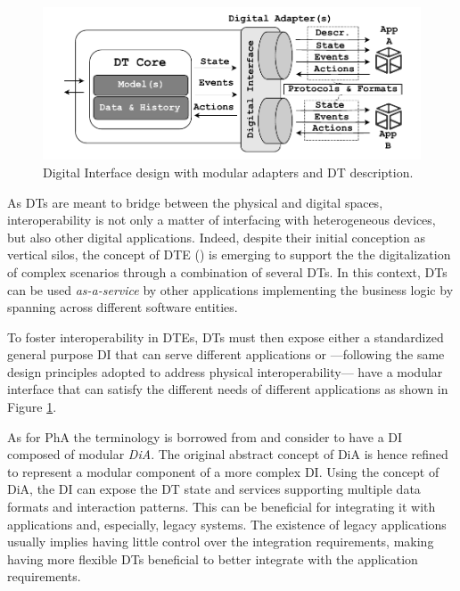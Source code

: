 \begin{figure}[t]
    \centering
    \includegraphics[width=\columnwidth]{figures/dt-interoperability/dt_interoperability_digital.pdf}
    \caption{Digital Interface design with modular adapters and DT description.}
    \label{fig:digital_interoperability}
\end{figure}

As \acp{DT} are meant to bridge between the physical and digital spaces,
interoperability is not only a matter of interfacing with heterogeneous devices, but also other digital applications.
Indeed, despite their initial conception as vertical silos, the concept of \ac{DTE} () is emerging to support the the digitalization of complex scenarios through a combination of several \acp{DT}.
%
In this context, \acp{DT} can be used \emph{as-a-service} by other applications implementing the business logic by spanning across different software entities.

To foster interoperability in \acp{DTE}, \acp{DT} must then expose either a standardized general purpose \acf{DI} that can serve different applications or
---following the same design principles adopted to address physical interoperability---
have a modular interface that can satisfy the different needs of different applications
as shown in Figure \ref{fig:digital_interoperability}.

As for \ac{PhA} the terminology is borrowed from \cite{web-of-dt-ricci-2022} and consider to have a \ac{DI} composed of modular \emph{\ac{DiA}}.
The original abstract concept of \ac{DiA} is hence refined to represent a modular component of a more complex \ac{DI}.
Using the concept of \ac{DiA}, the \ac{DI} can expose the \ac{DT} state and services supporting multiple data formats and interaction patterns.
This can be beneficial for integrating it with applications and, especially, legacy systems.
The existence of legacy applications usually implies having little control over the integration requirements, making having more flexible \acp{DT} beneficial to better integrate with the application requirements.

